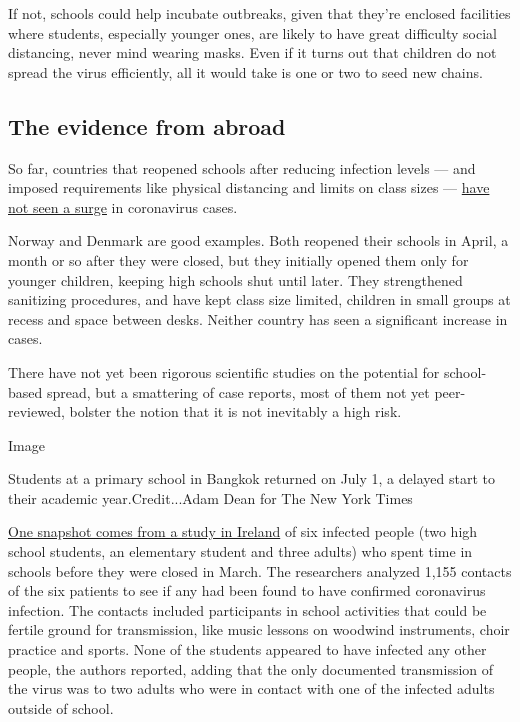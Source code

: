 If not, schools could help incubate outbreaks, given that they're
enclosed facilities where students, especially younger ones, are likely
to have great difficulty social distancing, never mind wearing masks.
Even if it turns out that children do not spread the virus efficiently,
all it would take is one or two to seed new chains.

\hypertarget{the-evidence-from-abroad}{%
\subsection{The evidence from abroad}\label{the-evidence-from-abroad}}

So far, countries that reopened schools after reducing infection levels
--- and imposed requirements like physical distancing and limits on
class sizes ---
\href{https://globalhealth.washington.edu/sites/default/files/COVID-19\%20Schools\%20Summary\%20\%282\%29.pdf?mkt_tok=eyJpIjoiTkRreE5XWXlORFF3TXpNeCIsInQiOiJIbVNQTTVySEo0Vzk1cHVBZVVqWnFGVmR1UEJxRGdpd01mTXg4OGw3Mk5nTnpmaUoyMGt2UXIwWVZBOE5GVjIybHA5aStrbzJ3MUxsanoxamZibmlocmpSbXZyVFVoV0VHYU1aTGx0RnpsMXlmOEtXSVJqaDJsZ0RJU1BQcVZjZSJ9}{have
not seen a surge} in coronavirus cases.

Norway and Denmark are good examples. Both reopened their schools in
April, a month or so after they were closed, but they initially opened
them only for younger children, keeping high schools shut until later.
They strengthened sanitizing procedures, and have kept class size
limited, children in small groups at recess and space between desks.
Neither country has seen a significant increase in cases.

There have not yet been rigorous scientific studies on the potential for
school-based spread, but a smattering of case reports, most of them not
yet peer-reviewed, bolster the notion that it is not inevitably a high
risk.

Image

Students at a primary school in Bangkok returned on July 1, a delayed
start to their academic year.Credit...Adam Dean for The New York Times

\href{https://www.eurosurveillance.org/content/10.2807/1560-7917.ES.2020.25.21.2000903\#html_fulltext}{One
snapshot comes from a study in Ireland} of six infected people (two high
school students, an elementary student and three adults) who spent time
in schools before they were closed in March. The researchers analyzed
1,155 contacts of the six patients to see if any had been found to have
confirmed coronavirus infection. The contacts included participants in
school activities that could be fertile ground for transmission, like
music lessons on woodwind instruments, choir practice and sports. None
of the students appeared to have infected any other people, the authors
reported, adding that the only documented transmission of the virus was
to two adults who were in contact with one of the infected adults
outside of school.

